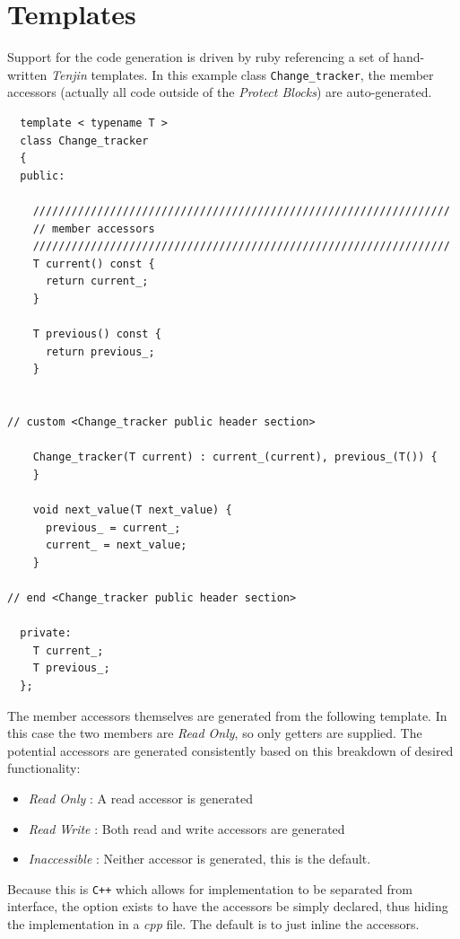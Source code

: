 \documentclass[11pt]{article}
\begin{document}
\section{Templates}
\label{sec-5}


  Support for the code generation is driven by ruby referencing a set
  of hand-written \emph{Tenjin} templates. In this example class
  \texttt{Change\_tracker}, the member accessors (actually all code outside of
  the \emph{Protect Blocks}) are auto-generated.


\lstset{language=C++}
\begin{lstlisting}
  template < typename T > 
  class Change_tracker 
  {
  public:

    /////////////////////////////////////////////////////////////////
    // member accessors
    /////////////////////////////////////////////////////////////////
    T current() const {
      return current_;
    }

    T previous() const {
      return previous_;
    }

  
// custom <Change_tracker public header section>

    Change_tracker(T current) : current_(current), previous_(T()) {
    }

    void next_value(T next_value) {
      previous_ = current_;
      current_ = next_value;
    }

// end <Change_tracker public header section>

  private:
    T current_;
    T previous_;
  };
\end{lstlisting}



\pagebreak
  The member accessors themselves are generated from the following
  template. In this case the two members are \emph{Read Only}, so only
  getters are supplied. The potential accessors are generated
  consistently based on this breakdown of desired functionality:
\begin{itemize}
\item \emph{Read Only} : A read accessor is generated
\item \emph{Read Write} : Both read and write accessors are generated
\item \emph{Inaccessible} : Neither accessor is generated, this is the
    default.
\end{itemize}
  Because this is \texttt{C++} which allows for implementation to be separated
  from interface, the option exists to have the accessors be simply
  declared, thus hiding the implementation in a \emph{cpp} file. The
  default is to just inline the accessors.
\end{document}
